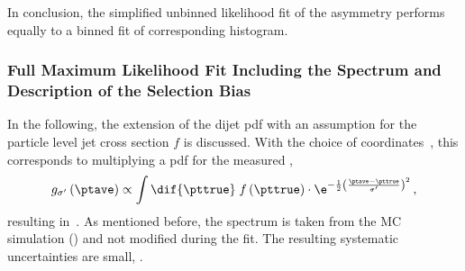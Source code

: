 In conclusion, the simplified unbinned likelihood fit of the asymmetry performs equally to a binned fit of corresponding histogram.



\subsubsection{Full Maximum Likelihood Fit Including the Spectrum and Description of the Selection Bias}\label{sec:ResFit:DataDriven:FullFit}

In the following, the extension of the dijet pdf with an assumption for the particle level jet \pt cross section $f$ is discussed.
With the choice of coordinates~, this corresponds to multiplying a pdf for the measured \ptave,
\begin{equation*}
 g_{\sigma'}\left(\ptave\right) \propto
  \int\dif{\pttrue}\;f\left(\pttrue\right)\cdot
  \e^{-\frac{1}{2}\left(\frac{\ptave - \pttrue}{\sigma'}\right)^{2}} \, , 
\end{equation*}
resulting in~.
As mentioned before, the spectrum is taken from the MC simulation () and not modified during the fit.
The resulting systematic uncertainties are small, .

